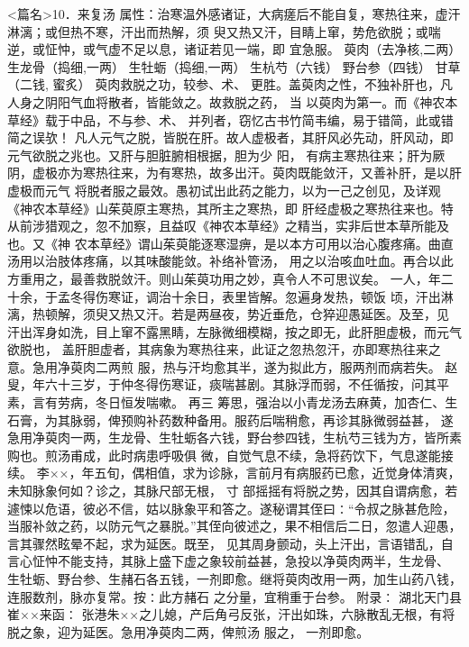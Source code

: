 \documentclass[a4paper,12pt,UTF8,twoside]{ctexbook}
\begin{document}
<篇名>10．来复汤
属性：治寒温外感诸证，大病瘥后不能自复，寒热往来，虚汗淋漓；或但热不寒，汗出而热解，须 
臾又热又汗，目睛上窜，势危欲脱；或喘逆，或怔忡，或气虚不足以息，诸证若见一端，即 
宜急服。 
萸肉（去净核,二两） 生龙骨（捣细,一两） 生牡蛎（捣细,一两） 生杭芍（六钱） 野台参（四钱） 甘草（二钱, 
蜜炙） 
萸肉救脱之功，较参、术、 更胜。盖萸肉之性，不独补肝也，凡人身之阴阳气血将散者，皆能敛之。故救脱之药， 
当 
以萸肉为第一。而《神农本草经》载于中品，不与参、术、 并列者，窃忆古书竹简韦编，易于错简，此或错简之误欤！ 
凡人元气之脱，皆脱在肝。故人虚极者，其肝风必先动，肝风动，即元气欲脱之兆也。又肝与胆脏腑相根据，胆为少 
阳， 
有病主寒热往来；肝为厥阴，虚极亦为寒热往来，为有寒热，故多出汗。萸肉既能敛汗，又善补肝，是以肝虚极而元气 
将脱者服之最效。愚初试出此药之能力，以为一己之创见，及详观《神农本草经》山茱萸原主寒热，其所主之寒热，即 
肝经虚极之寒热往来也。特从前涉猎观之，忽不加察，且益叹《神农本草经》之精当，实非后世本草所能及也。又《神 
农本草经》谓山茱萸能逐寒湿痹，是以本方可用以治心腹疼痛。曲直汤用以治肢体疼痛，以其味酸能敛。补络补管汤， 
用之以治咳血吐血。再合以此方重用之，最善救脱敛汗。则山茱萸功用之妙，真令人不可思议矣。 
一人，年二十余，于孟冬得伤寒证，调治十余日，表里皆解。忽遍身发热，顿饭 
顷，汗出淋漓，热顿解，须臾又热又汗。若是两昼夜，势近垂危，仓猝迎愚延医。及至，见 
汗出浑身如洗，目上窜不露黑睛，左脉微细模糊，按之即无，此肝胆虚极，而元气欲脱也， 
盖肝胆虚者，其病象为寒热往来，此证之忽热忽汗，亦即寒热往来之意。急用净萸肉二两煎 
服，热与汗均愈其半，遂为拟此方，服两剂而病若失。 
赵叟，年六十三岁，于仲冬得伤寒证，痰喘甚剧。其脉浮而弱，不任循按，问其平素，言有劳病，冬日恒发喘嗽。 
再三 
筹思，强治以小青龙汤去麻黄，加杏仁、生石膏，为其脉弱，俾预购补药数种备用。服药后喘稍愈，再诊其脉微弱益甚， 
遂急用净萸肉一两，生龙骨、生牡蛎各六钱，野台参四钱，生杭芍三钱为方，皆所素购也。煎汤甫成，此时病患呼吸俱 
微，自觉气息不续，急将药饮下，气息遂能接续。 
李××，年五旬，偶相值，求为诊脉，言前月有病服药已愈，近觉身体清爽，未知脉象何如？诊之，其脉尺部无根， 
寸 
部摇摇有将脱之势，因其自谓病愈，若遽悚以危语，彼必不信，姑以脉象平和答之。遂秘谓其侄曰∶“令叔之脉甚危险， 
当服补敛之药，以防元气之暴脱。”其侄向彼述之，果不相信后二日，忽遣人迎愚，言其骤然眩晕不起，求为延医。既至， 
见其周身颤动，头上汗出，言语错乱，自言心怔忡不能支持，其脉上盛下虚之象较前益甚，急投以净萸肉两半，生龙骨、 
生牡蛎、野台参、生赭石各五钱，一剂即愈。继将萸肉改用一两，加生山药八钱，连服数剂，脉亦复常。按∶此方赭石 
之分量，宜稍重于台参。 
附录∶ 
湖北天门县崔××来函∶ 
张港朱××之儿媳，产后角弓反张，汗出如珠，六脉散乱无根，有将脱之象，迎为延医。急用净萸肉二两，俾煎汤 
服之， 
一剂即愈。 
\end{document}
